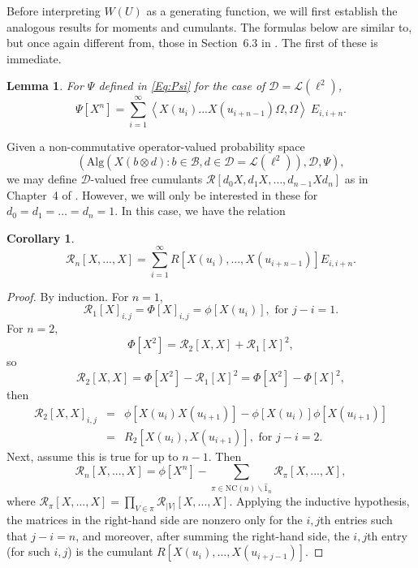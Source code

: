 \documentclass[12pt]{amsart}
\newtheorem{Cor}[Thm]{Corollary}
\newtheorem{Lemma}[Thm]{Lemma}
\theoremstyle{definition}
\newcommand{\mc}[1]{\mathcal{#1}}
\newcommand{\ip}[2]{\left \langle{#1},{#2} \right \rangle}
\begin{document}
Before interpreting $W(U)$ as a generating function, we will first establish the analogous results for moments and cumulants. The formulas below are similar to, but once again different from, those in Section~6.3 in \cite{Popa-Vinnikov-NC-functions}. The first of these is immediate.


\begin{Lemma}
For $\Psi$ defined in \eqref{Eq:Psi} for the case of $\mc{D} = \mc{L}(\ell^2)$,
\begin{equation}
\Psi[X^n] = \sum_{i=1}^\infty \ip{X(u_i) ... X(u_{i+n-1}) \Omega}{\Omega} \ E_{i, i + n}.
\end{equation}
\end{Lemma}


Given a non-commutative operator-valued probability space
\[
(\mathrm{Alg}(X(b \otimes d) : b \in \mc{B}, d \in \mc{D} = \mc{L}(\ell^2)), \mc{D}, \Psi),
\]
we may define $\mc{D}$-valued free cumulants $\mc{R}[d_0 X, d_1 X, \ldots, d_{n-1} X d_n]$ as in Chapter~4 of \cite{SpeHab}. However, we will only be interested in these for $d_0 = d_1 = \ldots = d_n = 1$. In this case, we have the relation

\begin{Cor}
\label{Cor:MatricialCumulants}
\begin{equation}
\mc{R}_n[X, ..., X] = \sum_{i = 1}^\infty R[X(u_i), ..., X(u_{i + n - 1})] E_{i, i + n}.
\end{equation}
\end{Cor}


\begin{proof}
By induction. For $n=1$,
\begin{equation*}
\mc{R}_1[X]_{i,j} = \Phi[X]_{i,j} = \phi[X(u_i)], \text{ for }j-i=1.
\end{equation*}
For $n=2$,
\begin{equation*}
\Phi[X^2] = \mc{R}_2[X,X] + \mc{R}_1[X]^2,
\end{equation*}
so
\begin{equation*}
\mc{R}_2[X,X] = \Phi[X^2] - \mc{R}_1[X]^2 = \Phi[X^2] - \Phi[X]^2,
\end{equation*}
then
\begin{eqnarray*}
\mc{R}_2[X,X]_{i,j}&=& \phi[X(u_i)X(u_{i+1})] - \phi[X(u_i)]\phi[X(u_{i+1})] \\
&=& R_2[X(u_i),X(u_{i+1})], \text{ for }j-i=2.
\end{eqnarray*}
Next, assume this is true for up to $n-1$. Then
\begin{equation*}
\mc{R}_n[X,...,X] = \phi[X^n] - \sum_{\pi\in\mathrm{NC}(n)\backslash \widehat{1}_n} \mc{R}_\pi [X,...,X],
\end{equation*}
where $\mc{R}_\pi[X,...,X] = \prod_{V\in\pi} \mc{R}_{|V|}[X,...,X]$. Applying the inductive hypothesis, the matrices in the right-hand side are nonzero only for the $i,j$th entries such that $j-i=n$, and moreover, after summing the right-hand side, the $i,j$th entry (for such $i,j$) is the cumulant $R[X(u_i),..., X(u_{i+j-1})]$.
\end{proof}
\end{document}
